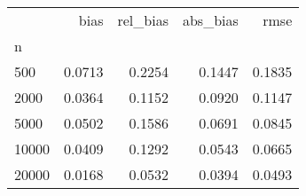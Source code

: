 \begin{tabular}{lrrrr}
\toprule
{} &   bias &  rel\_bias &  abs\_bias &   rmse \\
n     &        &           &           &        \\
\midrule
500   & 0.0713 &    0.2254 &    0.1447 & 0.1835 \\
2000  & 0.0364 &    0.1152 &    0.0920 & 0.1147 \\
5000  & 0.0502 &    0.1586 &    0.0691 & 0.0845 \\
10000 & 0.0409 &    0.1292 &    0.0543 & 0.0665 \\
20000 & 0.0168 &    0.0532 &    0.0394 & 0.0493 \\
\bottomrule
\end{tabular}
